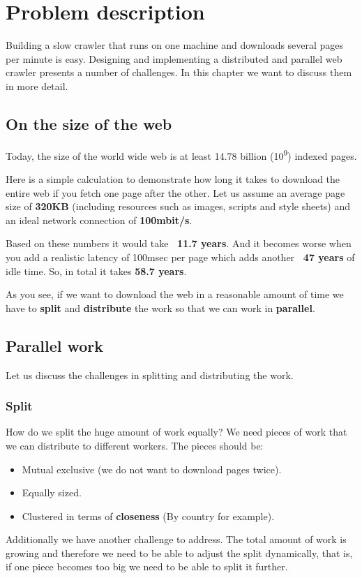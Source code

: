 \chapter{Problem description} %
Building a slow crawler that runs on one machine and downloads several pages per minute is easy. Designing and implementing a distributed and parallel web crawler presents a number of challenges. In this chapter we want to discuss them in more detail.

\label{Chapter3} %


\section{On the size of the web}
Today, the size of the world wide web is at least 14.78 billion (10\textsuperscript{9}) indexed pages.\cite{wwwsize}

Here is a simple calculation to demonstrate how long it takes to download the entire web if you fetch one page after the other.
Let us assume an average page size of \textbf{320KB} \cite{webmetrics} (including resources such as images, scripts and style sheets) and an ideal network connection of \textbf{100mbit/s}.

Based on these numbers it would take \textbf{~11.7 years}. And it becomes worse when you add a realistic latency of 100msec per page which adds another \textbf{~47 years} of idle time. So, in total it takes \textbf{58.7 years}.

As you see, if we want to download the web in a reasonable amount of time we have to \textbf{split} and \textbf{distribute} the work so that we can work in \textbf{parallel}.

\section{Parallel work}
Let us discuss the challenges in splitting and distributing the work.
\subsection{Split}
How do we split the huge amount of work equally? We need pieces of work that we can distribute to different workers. The pieces should be:
\begin{itemize}
\item Mutual exclusive (we do not want to download pages twice).
\item Equally sized.
\item Clustered in terms of \textbf{closeness} (By country for example).
\end{itemize}
Additionally we have another challenge to address. The total amount of work is growing and therefore we need to be able to adjust the split dynamically, that is, if one piece becomes too big we need to be able to split it further.
